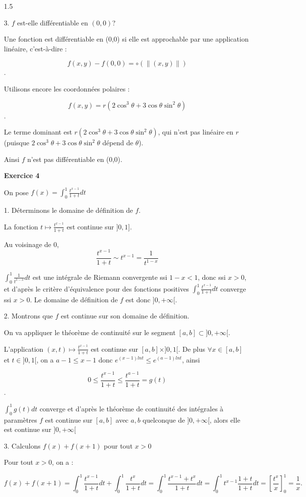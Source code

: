\documentclass[12pt]{article}
\begin{document}
\begin{spacing}{1.5}
 
 3. $f$ est-elle différentiable en $(0,0)$?
 
 Une fonction est différentiable en (0,0) si elle est approchable par une application linéaire, c'est-à-dire :
 
 \[f(x,y)-f(0,0)=\circ(\parallel (x,y)\parallel)\].
 
 Utilisons encore les coordonnées polaires :
 
 \[f(x,y)=r(2\cos^3\theta+3\cos\theta\sin^2\theta)\].
 
 Le terme dominant est $r(2\cos^3\theta+3\cos\theta\sin^2\theta)$, qui n'est pas linéaire en $r$(puisque $2\cos^3\theta+3\cos\theta\sin^2\theta$ dépend de $\theta$).
 
 Ainsi $f$ n'est pas différentiable en (0,0).
 

\medskip\textbf{Exercice 4}

On pose $f(x)=\int_{0}^{1}\frac{t^{x-1}}{1+t}dt$

1. Déterminons le domaine de définition de $f$.

La fonction $t\mapsto \frac{t^{x-1}}{1+t}$ est continue sur $]0,1]$.

Au voisinage de 0, \[\frac{t^{x-1}}{1+t}\sim t^{x-1}=\frac{1}{t^{1-x}}\]

$\int_{0}^{1}\frac{1}{t^{1-x}}dt$ est une intégrale de Riemann convergente ssi $1-x<1$, donc ssi $x>0$, et d'après le critère d'équivalence pour des fonctions positives $\int_{0}^{1}\frac{t^{x-1}}{1+t}dt$ converge ssi $x>0$. Le domaine de définition de $f$ est donc $]0,+\infty[$.


2. Montrons que $f$ est continue sur son domaine de définition.

On va appliquer le théorème de continuité sur le segment $[a,b]\subset]0,+\infty[$.

L'application $(x,t)\mapsto \frac{t^{x-1}}{1+t}$ est continue sur $[a,b]\times]0,1[$. De plus $\forall x\in [a,b]$ et $t\in ]0,1[$, on a $a-1\leqslant x-1$ donc $e^{(x-1)lnt}\leqslant e^{(a-1)lnt}$, ainsi 

\[0\leqslant \frac{t^{x-1}}{1+t}\leqslant \frac{t^{a-1}}{1+t}=g(t)\].

$\int_0^1g(t)dt$ converge et d'après le théorème de continuité des intégrales à paramètres $f$ est continue sur $[a,b]$ avec $a,b$ quelconque de $]0,+\infty[$, alors elle est continue sur $]0,+\infty[$

3. Calculons $f(x)+f(x+1)$ pour tout $x>0$

Pour tout $x>0$, on a : 

\[
f(x)+f(x+1)=\int_{0}^{1}\frac{t^{x-1}}{1+t}dt+\int_{0}^{1}\frac{t^{x}}{1+t}dt=\int_{0}^{1}\frac{t^{x-1}+t^x}{1+t}dt=\int_{0}^{1}t^{x-1}\frac{1+t}{1+t}dt=[\frac{t^x}{x}]_0^1=\frac{1}{x}.
\]



\end{spacing}
\end{document}
